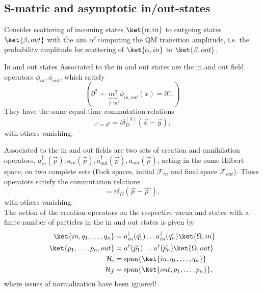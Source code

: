 \subsection{S-matric and asymptotic in/out-states}
Consider scattering of incoming states $\ket{\alpha,in}$ to outgoing states $\ket{\beta,out}$ with the aim of computing the QM transition amplitude, i.e. the probability amplitude for scattering of $\ket{\alpha,in}$ to $\ket{\beta,out}$.
\begin{mybox}{In and out states}
	Associated to the in and out states are the in and out field operators $\phi_{in}, \phi_{out}$, which satisfy
	\begin{equation}
		(\partial^2+\underbrace{m^2}_{\neq m^2_0}  \phi_{in, out} (x) = 0 !!.)
	\end{equation}
	They have the same equal time commutation relations
	\begin{equation}
		[\phi_{in, out}(x),\Pi_{in,out} (y)]_{x^0=y^0} = i \delta^{(3)}_D (\vec{x}-\vec{y}),
	\end{equation}
	with others vanishing.
\end{mybox}
Associated to the in and out fields are two sets of creation and annihilation operators, $a^{\dagger}_{in}(\vec{p}), a_{in}(\vec{p}), a^{\dagger}_{out}(\vec{p}),a_{out}(\vec{p})$, acting in the same Hilbert space, on two complete sets (Fock spaces, initial $\mathcal{F}_{in}$ and final space $\mathcal{F}_{out}$). These operators satisfy the commutation relations
\begin{equation}
	[a_{in,out}(\vec{p}) , a^{\dagger}_{in,out} (\vec{p})]= i \delta_D(\vec{p}-\vec{p}'),
\end{equation}
with others vanishing.\\
The action of the creation operators on the respective vacua and states with a finite number of particles in the in and out states is given by
\begin{align}
	\ket{in, q_1, \dots,q_n} &=a^{\dagger}_{in}(\vec{q}_1) \dots a^{\dagger}_{in} (\vec{q}_n) \ket{\Omega,in}\\
	\ket{p_1,\dots, p_n, out} &= a^{\dagger}(\vec{p}_1) \dots a^{\dagger}(\vec{p}_n) \ket{\Omega,out}\\
	\mathcal{H}_i &= \mathrm{span}\{\ket{in, q_1,\dots, q_n}\}\\
	\mathcal{H}_f &= \mathrm{span}\{\ket{out,p_1,\dots,p_n}\},
\end{align}
where issues of normalization have been ignored!
